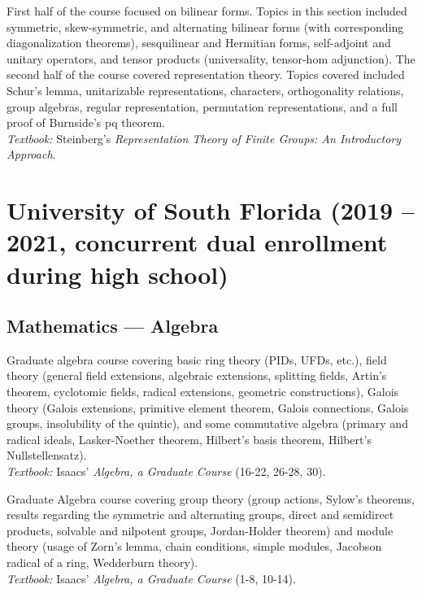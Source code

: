 \documentclass[11pt,letterpaper,sans]{moderncv}
\begin{document}
%
  {First half of the course focused on bilinear forms. Topics in this section included symmetric, skew-symmetric, and alternating bilinear forms (with corresponding diagonalization theorems), sesquilinear and Hermitian forms, self-adjoint and unitary operators, and tensor products (universality, tensor-hom adjunction). The second half of the course covered representation theory. Topics covered included Schur's lemma, unitarizable representations, characters, orthogonality relations, group algebras, regular representation, permutation representations, and a full proof of Burnside's pq theorem. \\ \emph{Textbook: }Steinberg's \emph{Representation Theory of Finite Groups: An Introductory Approach}.}


\section{University of South Florida (2019 -- 2021, concurrent dual enrollment during high school)}


\subsection{Mathematics --- Algebra}

%
  {Graduate algebra course covering basic ring theory (PIDs, UFDs, etc.), field theory (general field extensions, algebraic extensions, splitting fields, Artin's theorem, cyclotomic fields, radical extensions, geometric constructions), Galois theory (Galois extensions, primitive element theorem, Galois connections, Galois groups, insolubility of the quintic), and some commutative algebra (primary and radical ideals, Lasker-Noether theorem, Hilbert's basis theorem, Hilbert's Nullstellensatz).  \\ \emph{Textbook: }Isaacs' \emph{Algebra, a Graduate Course} (16-22, 26-28, 30).}

%
  {Graduate Algebra course covering group theory (group actions, Sylow's theorems, results regarding the symmetric and alternating groups, direct and semidirect products, solvable and nilpotent groups, Jordan-Holder theorem) and module theory (usage of Zorn's lemma, chain conditions, simple modules, Jacobson radical of a ring, Wedderburn theory). \\ \emph{Textbook: }Isaacs' \emph{Algebra, a Graduate Course} (1-8, 10-14).}
\end{document}
